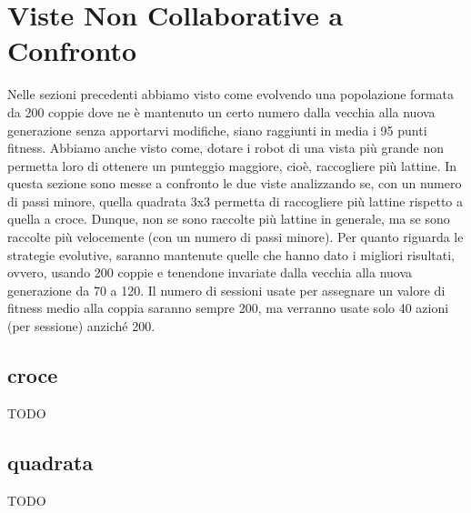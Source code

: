\section{Viste Non Collaborative a Confronto}
Nelle sezioni precedenti abbiamo visto come evolvendo una popolazione formata da
200 coppie dove ne è mantenuto un certo numero dalla vecchia alla nuova
generazione senza apportarvi modifiche, siano raggiunti in media i 95 punti
fitness. Abbiamo anche visto come, dotare i robot di una vista più grande non
permetta loro di ottenere un punteggio maggiore, cioè, raccogliere più
lattine.\newline
In questa sezione sono messe a confronto le due viste analizzando se, con un
numero di passi minore, quella quadrata 3x3 permetta di raccogliere più lattine
rispetto a quella a croce. Dunque, non se sono raccolte più lattine in generale,
ma se sono raccolte più velocemente (con un numero di passi minore).\newline
Per quanto riguarda le strategie evolutive, saranno mantenute quelle che hanno
dato i migliori risultati, ovvero, usando 200 coppie e tenendone invariate dalla
vecchia alla nuova generazione da 70 a 120. Il numero di sessioni usate per
assegnare un valore di fitness medio alla coppia saranno sempre 200, ma verranno
usate solo 40 azioni (per sessione) anziché 200.

\subsection{croce}
TODO

\subsection{quadrata}
TODO
